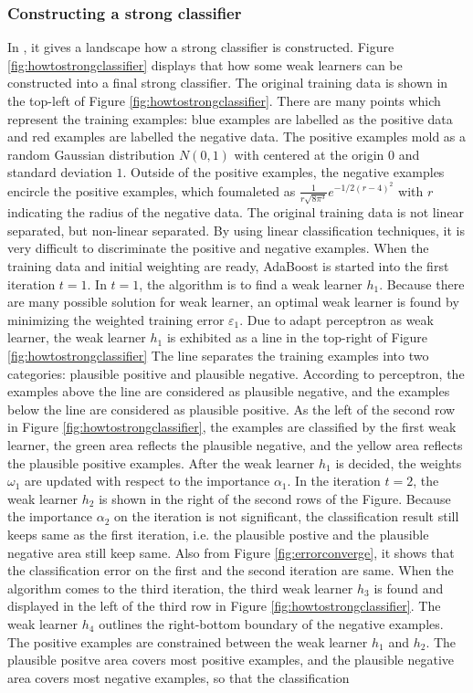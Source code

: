 \subsubsection{Constructing a strong classifier}
In \cite{}, it gives a landscape how a strong classifier is constructed. \mbox{Figure} \ref{fig:howtostrongclassifier} displays that how some weak learners can be constructed into a final strong classifier. The original training data is shown in the top-left of \mbox{Figure} \ref{fig:howtostrongclassifier}. There are many points which represent the training examples: blue examples are labelled as the positive data and red examples are labelled the negative data. The positive examples mold as a random Gaussian distribution $N(0,1)$ with centered at the origin $0$ and standard deviation $1$. Outside of the positive examples, the negative examples encircle the positive examples, which foumaleted as $\frac{1}{r\sqrt{8\pi^{3}}}e^{-1/2(r-4)^{2}}$ with $r$ indicating the radius of the negative data. The original training data is not linear separated, but non-linear separated. By using linear classification techniques, it is very difficult to discriminate the positive and negative examples. When the training data and initial weighting are ready, AdaBoost is started into the first iteration $t=1$.  In $t=1$, the algorithm is to find a weak learner $h_{1}$. Because there are many possible solution for weak learner, an optimal weak learner is found by minimizing the weighted training error $\varepsilon_{1}$. Due to adapt perceptron as weak learner, the weak learner $h_{1}$ is exhibited as a line in the top-right of \mbox{Figure} \ref{fig:howtostrongclassifier}  The line separates the training examples into two categories: plausible positive and plausible negative. According to perceptron, the examples above the line are considered as plausible negative, and the examples below the line are considered as plausible positive. As the left of the second row in \mbox{Figure} \ref{fig:howtostrongclassifier}, the examples are classified by the first weak learner, the green area reflects the plausible negative, and the yellow area reflects the plausible positive examples. After the weak learner $h_{1}$ is decided, the weights $\omega_{1}$ are updated with respect to the importance $\alpha_{1}$. In the iteration $t=2$, the weak learner $h_{2}$ is shown in the right of the second rows of the \mbox{Figure}. Because the importance $\alpha_{2}$ on the iteration is not significant, the classification result still keeps same as the first iteration, i.e. the plausible postive and the plausible negative area still keep same. Also from \mbox{Figure} \ref{fig:errorconverge}, it shows that the classification error on the first and the second iteration are same. When the algorithm comes to the third iteration, the third weak learner $h_{3}$ is found and displayed in the left of the third row in \mbox{Figure} \ref{fig:howtostrongclassifier}. The weak learner $h_{4}$ outlines the right-bottom boundary of the negative examples. The positive examples are constrained between the weak learner $h_{1}$ and $h_{2}$. The plausible positve area covers most positive examples, and the plausible negative area covers most negative examples, so that the classification 